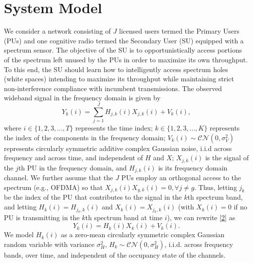 \documentclass[10pt,twocolumn]{IEEEtran}
\begin{document}
\section{System Model}\label{II}
We consider a network consisting of $J$ licensed users termed the Primary Users (PUs) and one cognitive radio termed the Secondary User (SU) equipped with a spectrum sensor. The objective of the SU is to opportunistically access portions of the spectrum left unused by the PUs in order to maximize its own throughput. To this end, the SU should learn how to intelligently access spectrum holes (white spaces) intending to maximize its throughput while maintaining strict non-interference compliance with incumbent transmissions. The observed wideband signal in the frequency domain is given by
\begin{equation}\label{2}
    Y_k(i) = \sum_{j=1}^{J} H_{j,k}(i)X_{j,k}(i) + V_k(i),
\end{equation}
where $i {\in} \{1,2,3,\dots,T\}$ represents the time index; $k {\in} \{1,2,3,\dots,K\}$ represents the index of the components in the frequency domain; $V_k(i) {\sim} \mathcal{CN}(0,\sigma_V^2)$ represents circularly symmetric additive complex Gaussian noise, i.i.d across frequency and across time, and independent of $H$ and $X$; $X_{j,k}(i)$ is the signal of the $j$th PU in the frequency domain, and $H_{j,k}(i)$ is its frequency domain channel. We further assume that the $J$ PUs employ an orthogonal access to the spectrum (e.g., OFDMA) so that $X_{j,k}(i)X_{g,k}(i)=0, \forall j{\neq}g$. Thus, letting $j_{k}$ be the index of the PU that contributes to the signal in the $k$th spectrum band, and letting  $H_{k}(i){=}H_{j_{k},k}(i)$ and $X_{k}(i){=}X_{j_{k},k}(i)$ (with $X_{k}(i){=}0$ if no PU is transmitting in the $k$th spectrum band at time $i$), we can rewrite \eqref{2} as 
\begin{equation}\label{3}
    Y_k(i) = H_{k}(i)X_{k}(i) + V_k(i).
\end{equation}
We model $H_{k}(i)$ as a zero-mean circularly symmetric complex Gaussian random variable with variance $\sigma_H^2$, $H_k {\sim} \mathcal{CN}(0,\sigma_H^2)$, i.i.d. across frequency bands, over time, and independent of the occupancy state of the channels.
\end{document}
